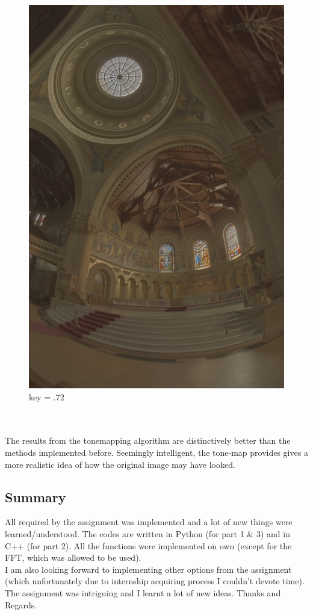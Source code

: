 \documentclass{article}
\begin{document}
\begin{figure}[!htb]
      \includegraphics[scale=.27]{./data/3/avar/7_2.jpg}
      \caption{key = .72}
    \endminipage
    \end{figure}
    \\
    \pagebreak
    \\
    The results from the tonemapping algorithm are distinctively better than the methods implemented before. Seemingly intelligent, the tone-map provides gives a more realistic idea of how the original image may have looked. \\
    \subsection*{Summary}
    All required by the assignment was implemented and a lot of new things were learned/understood. The codes are written in Python (for part 1 & 3) and in C++ (for part 2). All the functions were implemented on own (except for the FFT, which was allowed to be used). \\
    I am also looking forward to implementing other options from the assignment (which unfortunately due to internship acquiring process I couldn't devote time).\\
    The assignment was intriguing and I learnt a lot of new ideas. Thanks and Regards.
    
\end{document}
